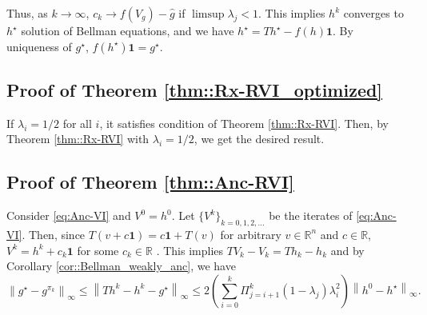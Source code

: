 \documentclass{article} %
\newcommand{\real}{\mathbb{R}}
\newcommand{\reals}{\mathbb{R}}
\newcommand*{\para}[1]{\left({#1}\right)}
\newcommand*{\infn}[1]{\left\|{#1}\right\|_{\infty}}
\begin{document}
  Thus, as $k \rightarrow \infty$, $c_k \rightarrow f(V_g)-\hat{g}$ if $\limsup \lambda_j <1 $. This implies $h^k$ converges to $h^{\star}$ solution of Bellman equations, and we have $h^{\star}=Th^{\star}-f(h)\mathbf{1}$. By uniqueness of $g^{\star}$, $f(h^{\star})\mathbf{1}=g^{\star}$. 
\subsection{Proof of Theorem \ref{thm::Rx-RVI_optimized}}
If $\lambda_i=1/2$ for all $i$, it satisfies condition of Theorem \ref{thm::Rx-RVI}. Then, by Theorem \ref{thm::Rx-RVI} with $\lambda_i=1/2$, we get the desired result. 

\subsection{Proof of Theorem \ref{thm::Anc-RVI}}
Consider \ref{eq:Anc-VI} and $V^0=h^0$. Let $\{V^k\}_{k=0, 1,2,\dots}$ be the iterates of \ref{eq:Anc-VI}.  Then, since $T(v+c\mathbf{1}) = c\mathbf{1}+T(v)$ for arbitrary $v \in \reals^n$ and $c \in \reals$, $V^{k} = h^{k}+c_k \mathbf{1}$ for some $c_k \in \real$ . This implies $TV_k-V_k = Th_k-h_k$ and by Corollary \ref{cor::Bellman_weakly_anc}, we have
\[ \infn{g^{\star}-g^{\pi_k}} \le  \infn{Th^k-h^k -g^{\star}} \le  2\para{\sum^k_{i=0} \Pi^k_{j=i+1}(1-\lambda_j) \lambda^2_i }\infn{h^0-h^{\star}}.\]
\end{document}
